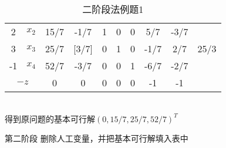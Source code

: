 \documentclass{book}
\begin{document}
\begin{table}[ht]
\begin{tabular}{c|c|c|cccccc|c}
        \hline
        2                                   & $x_2$                               & 15/7                              & -1/7  & 1     & 0     & 0     & 5/7   & -3/7  &                                        \\
        3                                   & $x_3$                               & 25/7                              & [3/7] & 0     & 1     & 0     & -1/7  & 2/7   & 25/3                                   \\
        -1                                  & $x_4$                               & 52/7                              & -3/7  & 0     & 0     & 1     & -6/7  & -2/7  &                                        \\
        \hline
        \multicolumn{2}{c|}{$-z$}           & 0                                   & 0                                 & 0     & 0     & 0     & -1    & -1    &                                                \\
        \hline
    \end{tabular}
    \caption{二阶段法例题1}
    \label{tab:example de two-phase method1}
\end{table}
\\
得到原问题的基本可行解$(0,15/7,25/7,52/7)^T$

第二阶段 删除人工变量，并把基本可行解填入表中
\end{document}
